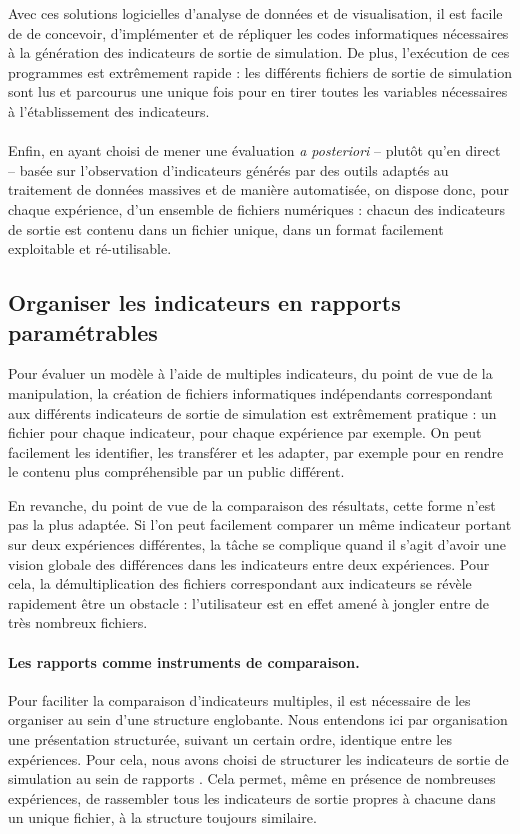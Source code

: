 Avec ces solutions logicielles d'analyse de données et de visualisation, il est facile de de concevoir, d'implémenter et de répliquer les codes informatiques nécessaires à la génération des indicateurs de sortie de simulation.
De plus, l'exécution de ces programmes est extrêmement rapide : les différents fichiers de sortie de simulation sont lus et parcourus une unique fois pour en tirer toutes les variables nécessaires à l'établissement des indicateurs.

\paragraph[Conclusion intermédiaire]{}
Enfin, en ayant choisi de mener une évaluation \textit{a posteriori} -- plutôt qu'en direct -- basée sur l'observation d'indicateurs générés par des outils adaptés au traitement de données massives et de manière automatisée, on dispose donc, pour chaque expérience, d'un ensemble de fichiers numériques : chacun des indicateurs de sortie est contenu dans un fichier unique, dans un format facilement exploitable et ré-utilisable. 

\subsection{Organiser les indicateurs en rapports paramétrables}

Pour évaluer un modèle à l'aide de multiples indicateurs, du point de vue de la manipulation, la création de fichiers informatiques indépendants correspondant aux différents indicateurs de sortie de simulation est extrêmement pratique : un fichier pour chaque indicateur, pour chaque expérience par exemple.
On peut facilement les identifier, les transférer et les adapter, par exemple pour en rendre le contenu plus compréhensible par un public différent.

En revanche, du point de vue de la comparaison des résultats, cette forme n'est pas la plus adaptée.
Si l'on peut facilement comparer un même indicateur portant sur deux expériences différentes, la tâche se complique quand il s'agit d'avoir une vision globale des différences dans les indicateurs entre deux expériences.
Pour cela, la démultiplication des fichiers correspondant aux indicateurs se révèle rapidement être un obstacle : l'utilisateur est en effet amené à jongler entre de très nombreux fichiers.

\paragraph{Les rapports comme instruments de comparaison.}
Pour faciliter la comparaison d'indicateurs multiples, il est nécessaire de les organiser au sein d'une structure englobante.
Nous entendons ici par organisation une présentation structurée, suivant un certain ordre, identique entre les expériences.
Pour cela, nous avons choisi de structurer les indicateurs de sortie de simulation au sein de \og rapports \fg{}.
Cela permet, même en présence de nombreuses expériences, de rassembler tous les indicateurs de sortie propres à chacune dans un unique fichier, à la structure toujours similaire.


